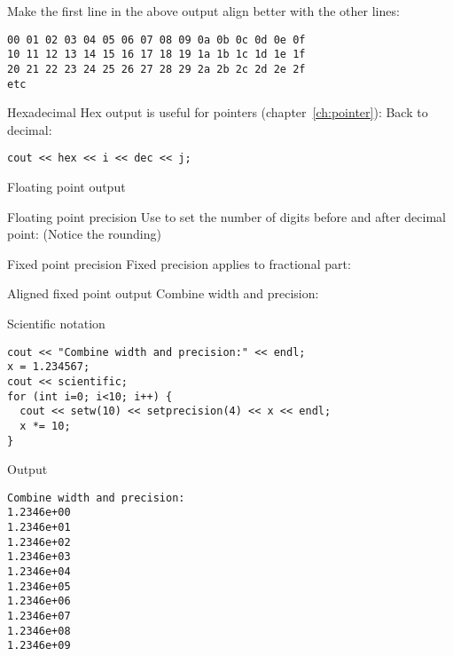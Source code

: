 \begin{exercise}
  \label{ex:leadzero}
  Make the first line in the above output align better with the other lines:
\begin{verbatim}
00 01 02 03 04 05 06 07 08 09 0a 0b 0c 0d 0e 0f 
10 11 12 13 14 15 16 17 18 19 1a 1b 1c 1d 1e 1f 
20 21 22 23 24 25 26 27 28 29 2a 2b 2c 2d 2e 2f 
etc
\end{verbatim}
\end{exercise}

\begin{block}{Hexadecimal}
  \label{sl:io-hex}
  Hex output is useful for pointers (chapter~\ref{ch:pointer}):
  Back to decimal:
\begin{lstlisting}
cout << hex << i << dec << j;
\end{lstlisting}
\end{block}

 {Floating point output}

\begin{block}{Floating point precision}
  \label{sl:io-float}
  Use  to set the number of digits before and after
  decimal point:
  (Notice the rounding)
\end{block}

\begin{block}{Fixed point precision}
  \label{sl:io-fix}
  Fixed precision applies to fractional part:
\end{block}

\begin{block}{Aligned fixed point output}
  \label{sl:io-align}
  Combine width and precision:
\end{block}

\begin{block}{Scientific notation}
  \label{sl:io-sci}
\begin{verbatim}
cout << "Combine width and precision:" << endl;
x = 1.234567;
cout << scientific;
for (int i=0; i<10; i++) {
  cout << setw(10) << setprecision(4) << x << endl;
  x *= 10;
}
\end{verbatim}
\end{block}

\begin{block}{Output}
  \label{sl:io-sci-out}
\begin{verbatim}
Combine width and precision:
1.2346e+00
1.2346e+01
1.2346e+02
1.2346e+03
1.2346e+04
1.2346e+05
1.2346e+06
1.2346e+07
1.2346e+08
1.2346e+09
\end{verbatim}
\end{block}

